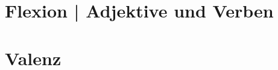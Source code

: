 \documentclass[handout,aspectratio=1610,dvipsnames]{beamer}
\begin{document}
  \section[Verbalflexion]{Flexion | Adjektive und Verben}
  \let\woopsi\section\let\section\subsection\let\subsection\subsubsection
  
  \let\subsection\section\let\section\woopsi
  
  \section[Valenz]{Valenz}
  \let\woopsi\section\let\section\subsection\let\subsection\subsubsection
  
  \let\subsection\section\let\section\woopsi
  
\end{document}
